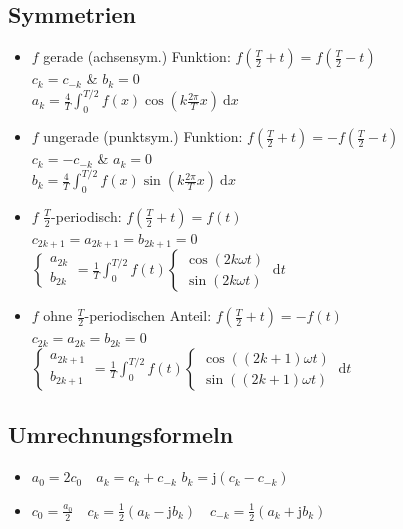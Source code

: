 \documentclass[6pt,a4paper]{scrartcl}
\renewcommand{\i}{\ensuremath{\mathrm{j}}}										%
\newcommand{\diff}{\ensuremath{\ \mathrm d}}									%
\begin{document}
\begin{multicols}{4}
	\subsection{Symmetrien}
	\vspace{0mm}
	\begin{itemize}\itemsep-5pt
	\item $f$ gerade (achsensym.) Funktion: $f(\frac{T}{2} + t) = f(\frac{T}{2} - t)$\\
	$c_k = c_{-k}$ \& $b_k = 0$\\
	$a_k = \frac{4}{T} \int_{0}^{T/2} f(x) \cos \left(k \frac{2\pi}{T} x \right) \diff x$
	\item $f$ ungerade (punktsym.) Funktion: $f(\frac{T}{2} + t) = -f(\frac{T}{2} - t)$\\
	$c_k = -c_{-k}$ \& $a_k = 0$\\
	$ b_k = \frac{4}{T} \int_{0}^{T/2} f(x) \sin \left(k \frac{2\pi}{T} x \right) \diff x$
	\item $f$ $\frac{T}{2}$-periodisch: $f(\frac{T}{2} + t) = f(t)$\\
	$c_{2k+1} = a_{2k+1} = b_{2k+1} = 0$\\
	$\begin{cases} a_{2k}\\ b_{2k} \end{cases} = \frac{1}{T}\int_0^{T/2}f(t)\begin{cases} \cos{(2k \omega t)}\\ \sin{(2k \omega t)} \end{cases} \diff t$
	\item $f$ ohne $\frac{T}{2}$-periodischen Anteil: $f(\frac{T}{2} + t) = -f(t)$\\
	$c_{2k} = a_{2k} = b_{2k} = 0$\\
	$\begin{cases} a_{2k+1}\\ b_{2k+1} \end{cases} = \frac{1}{T}\int_0^{T/2}f(t)\begin{cases} \cos{((2k+1) \omega t)}\\ \sin{((2k+1) \omega t)} \end{cases} \diff t$
	\end{itemize}

	\subsection{Umrechnungsformeln}	
	\begin{itemize} \itemsep-5pt
	\item $a_0 = 2 c_0 \quad a_k = c_k + c_{-k}$  \quad $b_k = \i (c_k - c_{-k})$
	\item $c_0 = \frac{a_0}{2} \quad c_k = \frac12(a_k - \i b_k) \quad c_{-k} = \frac12(a_k + \i b_k)$
	\end{itemize}
	

\end{multicols}
\end{document}
